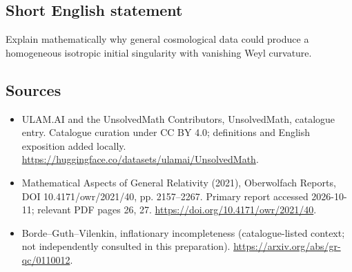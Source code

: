 \documentclass[11pt]{article}
\begin{document}
\subsection{Short English statement}
Explain mathematically why general cosmological data could produce a homogeneous isotropic initial singularity with vanishing Weyl curvature.
\subsection{Sources}
\begin{itemize}
\item[\hypertarget{source:statement:1}{S1}] ULAM.AI and the UnsolvedMath Contributors, UnsolvedMath, catalogue entry. Catalogue curation under CC BY 4.0; definitions and English exposition added locally.
\url{https://huggingface.co/datasets/ulamai/UnsolvedMath}.
\item[\hypertarget{source:statement:2}{S2}] Mathematical Aspects of General Relativity (2021), Oberwolfach Reports, DOI 10.4171/owr/2021/40, pp. 2157--2267. Primary report accessed 2026-10-11; relevant PDF pages 26, 27.
\url{https://doi.org/10.4171/owr/2021/40}.
\item[\hypertarget{source:statement:3}{S3}] Borde--Guth--Vilenkin, inflationary incompleteness (catalogue-listed context; not independently consulted in this preparation).
\url{https://arxiv.org/abs/gr-qc/0110012}.
\end{itemize}
\label{end:statement}
\end{document}
